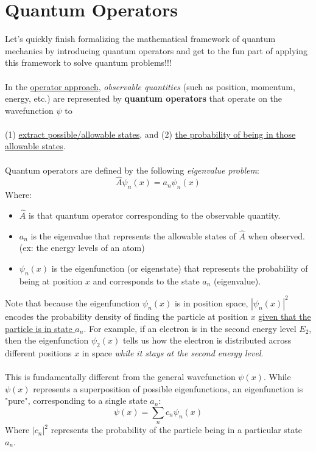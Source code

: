 \documentclass[12pt]{article}
\begin{document}
\section*{Quantum Operators}
Let's quickly finish formalizing the mathematical framework of quantum mechanics by introducing quantum operators and get to the fun part of applying this framework to solve quantum problems!!!\\\\
In the \underline{operator approach}, \textit{observable quantities} (such as position, momentum, energy, etc.) are represented by \textbf{quantum operators} that operate on the wavefunction $\psi$ to \\\\(1) \underline{extract possible/allowable states}, and (2) \underline{the probability of being in those allowable states}.\\\\
Quantum operators are defined by the following \textit{eigenvalue problem}:
\[\boxed{\hat{A}\psi_n(x)=a_n\psi_n(x)}\]
Where:
\begin{itemize}
    \item $\hat{A}$ is that quantum operator corresponding to the observable quantity.
    \item $a_n$ is the eigenvalue that represents the allowable states of $\hat{A}$ when observed. (ex: the energy levels of an atom)
    \item $\psi_n(x)$ is the eigenfunction (or eigenstate) that represents the probability of being at position $x$ and corresponds to the state $a_n$ (eigenvalue).
\end{itemize}
Note that because the eigenfunction $\psi_n(x)$ is in position space, $|\psi_n(x)|^2$ encodes the probability density of finding the particle at position $x$ \underline{given that the particle is in state $a_n$}. For example, if an electron is in the second energy level $E_2$, then the eigenfunction $\psi_2(x)$ tells us how the electron is distributed across different positions $x$ in space \textit{while it stays at the second energy level}.\\\\
This is fundamentally different from the general wavefunction $\psi(x)$. While $\psi(x)$ represents a superposition of possible eigenfunctions, an eigenfunction is "pure", corresponding to a single state $a_n$:
\[\psi(x)=\sum_n c_n \psi_n(x)\]
Where $|c_n|^2$ represents the probability of the particle being in a particular state $a_n$.\\\\
\end{document}
